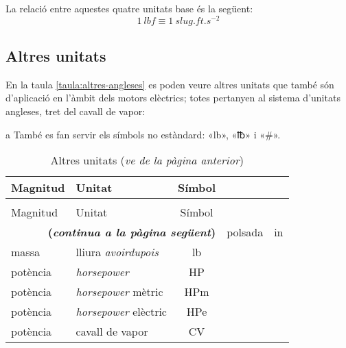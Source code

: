 La relació entre aquestes quatre unitats base és la següent:
\begin{equation}
    \qty{1}{lbf} \equiv \qty{1}{slug.ft.s^{-2}}
\end{equation}

\subsection{Altres unitats}

En la taula \vref{taula:altres-angleses} es poden veure altres unitats que també són d'aplicació en l'àmbit dels motors elèctrics; totes pertanyen al sistema d'unitats angleses, tret del cavall de vapor:
\begin{ThreePartTable}
	\begin{TableNotes}
		\item[a] {\footnotesize També es fan servir els símbols no estàndard: «lb», «℔» i  «\#».}
	\end{TableNotes}
	\begin{longtable}[h]{llc}
		\caption{\label{taula:altres-angleses}Altres unitats}\\
		\toprule[1pt]
		Magnitud & Unitat & Símbol \\
		\midrule
		\endfirsthead
		\caption[]{Altres unitats (\emph{ve de la pàgina anterior})}\\
		\toprule[1pt]
		Magnitud & Unitat & Símbol \\
		\midrule
		\endhead
		\midrule
		\multicolumn{3}{r}{\sffamily\bfseries\color{NavyBlue}(\emph{continua a la pàgina següent})}
		\endfoot
		\insertTableNotes
		\endlastfoot
		longitud & polsada & in \\
		massa & lliura \textit{avoirdupois} & lb\tnote{a} \\
		potència & \textit{horsepower} & HP \\
		potència & \textit{horsepower} mètric & \unit{HPm} \\
		potència & \textit{horsepower} elèctric & \unit{HPe} \\
		potència & cavall de vapor & CV \\
		\bottomrule[1pt]
	\end{longtable}
\end{ThreePartTable}
 


